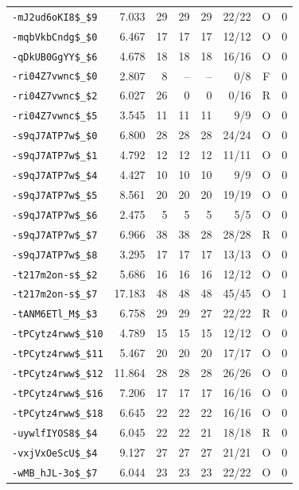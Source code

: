 {\begin{longtable}{lrrrrrcc}
\texttt{-mJ2ud6oKI8\$\_\$9} & 7.033 & 29 & 29 & 29 & 22/22 & O & 0 \\
\texttt{-mqbVkbCndg\$\_\$0} & 6.467 & 17 & 17 & 17 & 12/12 & O & 0 \\
\texttt{-qDkUB0GgYY\$\_\$6} & 4.678 & 18 & 18 & 18 & 16/16 & O & 0 \\
\texttt{-ri04Z7vwnc\$\_\$0} & 2.807 & 8 & -- & -- & 0/8 & F & 0 \\
\texttt{-ri04Z7vwnc\$\_\$2} & 6.027 & 26 & 0 & 0 & 0/16 & R & 0 \\
\texttt{-ri04Z7vwnc\$\_\$5} & 3.545 & 11 & 11 & 11 & 9/9 & O & 0 \\
\texttt{-s9qJ7ATP7w\$\_\$0} & 6.800 & 28 & 28 & 28 & 24/24 & O & 0 \\
\texttt{-s9qJ7ATP7w\$\_\$1} & 4.792 & 12 & 12 & 12 & 11/11 & O & 0 \\
\texttt{-s9qJ7ATP7w\$\_\$4} & 4.427 & 10 & 10 & 10 & 9/9 & O & 0 \\
\texttt{-s9qJ7ATP7w\$\_\$5} & 8.561 & 20 & 20 & 20 & 19/19 & O & 0 \\
\texttt{-s9qJ7ATP7w\$\_\$6} & 2.475 & 5 & 5 & 5 & 5/5 & O & 0 \\
\texttt{-s9qJ7ATP7w\$\_\$7} & 6.966 & 38 & 38 & 28 & 28/28 & R & 0 \\
\texttt{-s9qJ7ATP7w\$\_\$8} & 3.295 & 17 & 17 & 17 & 13/13 & O & 0 \\
\texttt{-t217m2on-s\$\_\$2} & 5.686 & 16 & 16 & 16 & 12/12 & O & 0 \\
\texttt{-t217m2on-s\$\_\$7} & 17.183 & 48 & 48 & 48 & 45/45 & O & 1 \\
\texttt{-tANM6ETl\_M\$\_\$3} & 6.758 & 29 & 29 & 27 & 22/22 & R & 0 \\
\texttt{-tPCytz4rww\$\_\$10} & 4.789 & 15 & 15 & 15 & 12/12 & O & 0 \\
\texttt{-tPCytz4rww\$\_\$11} & 5.467 & 20 & 20 & 20 & 17/17 & O & 0 \\
\texttt{-tPCytz4rww\$\_\$12} & 11.864 & 28 & 28 & 28 & 26/26 & O & 0 \\
\texttt{-tPCytz4rww\$\_\$16} & 7.206 & 17 & 17 & 17 & 16/16 & O & 0 \\
\texttt{-tPCytz4rww\$\_\$18} & 6.645 & 22 & 22 & 22 & 16/16 & O & 0 \\
\texttt{-uywlfIYOS8\$\_\$4} & 6.045 & 22 & 22 & 21 & 18/18 & R & 0 \\
\texttt{-vxjVxOeScU\$\_\$4} & 9.127 & 27 & 27 & 27 & 21/21 & O & 0 \\
\texttt{-wMB\_hJL-3o\$\_\$7} & 6.044 & 23 & 23 & 23 & 22/22 & O & 0 \\

\end{longtable}}
